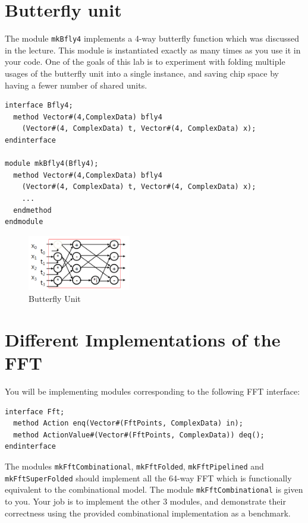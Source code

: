 \documentclass{article}
\begin{document}
\section{Butterfly unit}
The module \texttt{mkBfly4} implements a 4-way butterfly function which was
discussed in the lecture.
This module is instantiated exactly as many times as you use it in your code.
One of the goals of this lab is to experiment with folding multiple usages
of the butterfly unit into a single instance, and saving chip space
by having a fewer number of shared units.

\begin{verbatim}
interface Bfly4;
  method Vector#(4,ComplexData) bfly4
    (Vector#(4, ComplexData) t, Vector#(4, ComplexData) x);
endinterface

module mkBfly4(Bfly4);
  method Vector#(4,ComplexData) bfly4
    (Vector#(4, ComplexData) t, Vector#(4, ComplexData) x);
    ...
  endmethod
endmodule
\end{verbatim}

\begin{figure}[!h]
\centering
\vspace{-13pt}
\includegraphics[width=0.4\textwidth]{figs/bfly.png}
\caption{Butterfly Unit}
\vspace{-13pt}
\label{bfly}
\end{figure}

\section{Different Implementations of the FFT}
You will be implementing modules corresponding to the following FFT interface:

\begin{verbatim}
interface Fft;
  method Action enq(Vector#(FftPoints, ComplexData) in);
  method ActionValue#(Vector#(FftPoints, ComplexData)) deq();
endinterface
\end{verbatim}

The modules \texttt{mkFftCombinational}, \texttt{mkFftFolded}, \texttt{mkFftPipelined}
and \texttt{mkFftSuperFolded} should implement all the 64-way FFT which is functionally equivalent
to the combinational model. 
The module \texttt{mkFftCombinational} is given to you.
Your job is to implement the other 3 modules, and demonstrate their correctness
using the provided combinational implementation as a benchmark.
\end{document}
